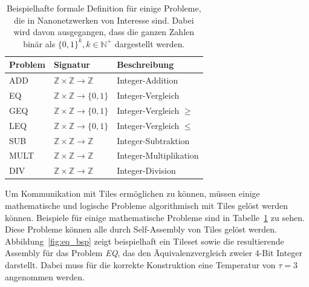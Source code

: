 \begin{table}
	\centering
	\begin{tabular}{lll}
		\hline Problem & Signatur & Beschreibung \\\hline
		ADD & $\mathbb{Z} \times \mathbb{Z} \rightarrow \mathbb{Z}$ & Integer-Addition \\
		EQ &  $\mathbb{Z} \times \mathbb{Z} \rightarrow \{0,1\}$ & Integer-Vergleich \\
		GEQ &  $\mathbb{Z} \times \mathbb{Z} \rightarrow \{0,1\}$ & Integer-Vergleich $\geq$ \\
		LEQ &  $\mathbb{Z} \times \mathbb{Z} \rightarrow \{0,1\}$ & Integer-Vergleich $\leq$ \\
		SUB & $\mathbb{Z} \times \mathbb{Z} \rightarrow \mathbb{Z}$ & Integer-Subtraktion \\
		MULT & $\mathbb{Z} \times \mathbb{Z} \rightarrow \mathbb{Z}$ & Integer-Multiplikation \\
		DIV & $\mathbb{Z} \times \mathbb{Z} \rightarrow \mathbb{Z}$ & Integer-Division \\\hline
	\end{tabular}
	\caption[formale Problemdefinitionen]{Beispielhafte formale Definition für einige Probleme, die in Nanonetzwerken von Interesse sind. Dabei wird davon ausgegangen, dass die ganzen Zahlen binär als $\{0,1\}^k, k\in\mathbb{N}^+$ dargestellt werden.\cite{lau2020phd}}
	\label{tab:problem_definitionen}
\end{table}

Um Kommunikation mit Tiles ermöglichen zu können, müssen einige mathematische und logische Probleme algorithmisch mit Tiles gelöst werden können.
Beispiele für einige mathematische Probleme sind in Tabelle~\ref{tab:problem_definitionen} zu sehen. Diese Probleme können alle durch Self-Assembly von Tiles gelöst werden. 
Abbildung~\ref{fig:eq_bsp} zeigt beispielhaft ein Tileset sowie die resultierende Assembly für das Problem \emph{EQ}, das den Äquivalenzvergleich zweier 4-Bit Integer darstellt.
Dabei muss für die korrekte Konstruktion eine Temperatur von $\tau = 3$ angenommen werden. 

